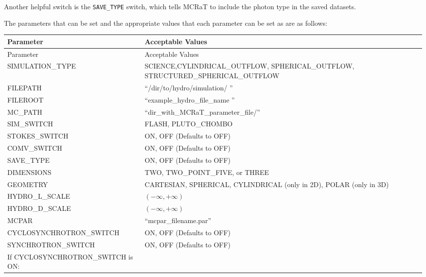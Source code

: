\documentclass[12pt,a4paper]{article}
\begin{document}
Another helpful switch is the \texttt{SAVE\_TYPE} switch, which tells MCRaT to include the photon type in the saved datasets. 


The parameters that can be set and the appropriate values that each parameter can be set as are as follows:

\begin{longtable}{|p{}|p{}|}
	\hline
	Parameter & Acceptable Values \\
	\hline
	\endfirsthead
	\hline
	Parameter & Acceptable Values \\
	\hline
	\endhead
SIMULATION\_TYPE & SCIENCE,\newline CYLINDRICAL\_OUTFLOW, \newline SPHERICAL\_OUTFLOW, \newline STRUCTURED\_SPHERICAL\_OUTFLOW \\ 
\hline 
FILEPATH & ``/dir/to/hydro/simulation/ '' \\ 
\hline 
FILEROOT & ``example\_hydro\_file\_name '' \\ 
\hline 
MC\_PATH & ``dir\_with\_MCRaT\_parameter\_file/'' \\ 
\hline 
SIM\_SWITCH & FLASH, PLUTO\_CHOMBO \\ 
\hline 
STOKES\_SWITCH & ON, OFF (Defaults to OFF) \\ 
\hline 
COMV\_SWITCH & ON, OFF (Defaults to OFF)\\ 
\hline 
SAVE\_TYPE & ON, OFF (Defaults to OFF)\\
\hline 
DIMENSIONS & TWO, TWO\_POINT\_FIVE, or THREE \\ 
\hline 
GEOMETRY & CARTESIAN, \newline SPHERICAL, \newline CYLINDRICAL (only in 2D), \newline POLAR (only in 3D)  \\ 
\hline  
HYDRO\_L\_SCALE & $(-\infty, +\infty)$ \\ 
\hline 
HYDRO\_D\_SCALE & $(-\infty, +\infty)$ \\ 
\hline 
MCPAR & ``mcpar\_filename.par'' \\ 
\hline 
CYCLOSYNCHROTRON\_SWITCH & ON, OFF (Defaults to OFF)\\
\hline 
SYNCHROTRON\_SWITCH & ON, OFF (Defaults to OFF)\\
\hline
\hline
If CYCLOSYNCHROTRON\_SWITCH is ON: & \\

\end{longtable}
\end{document}

